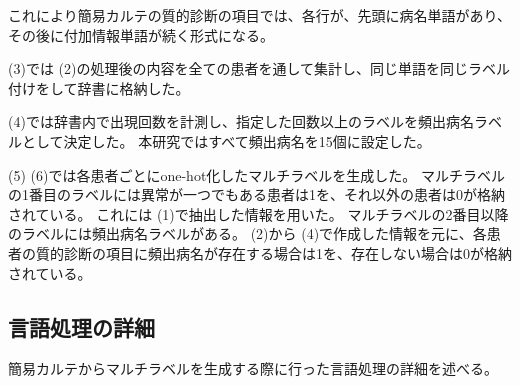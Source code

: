 これにより簡易カルテの質的診断の項目では、各行が、先頭に病名単語があり、その後に付加情報単語が続く形式になる。

(3)では (2)の処理後の内容を全ての患者を通して集計し、同じ単語を同じラベル付けをして辞書に格納した。 

(4)では辞書内で出現回数を計測し、指定した回数以上のラベルを頻出病名ラベルとして決定した。
本研究ではすべて頻出病名を15個に設定した。

 (5) (6)では各患者ごとにone-hot化したマルチラベルを生成した。
マルチラベルの1番目のラベルには異常が一つでもある患者は1を、それ以外の患者は0が格納されている。
これには (1)で抽出した情報を用いた。
マルチラベルの2番目以降のラベルには頻出病名ラベルがある。 
(2)から (4)で作成した情報を元に、各患者の質的診断の項目に頻出病名が存在する場合は1を、存在しない場合は0が格納されている。

\subsection{言語処理の詳細}
\label{sec:nl}
簡易カルテからマルチラベルを生成する際に行った言語処理の詳細を述べる。
